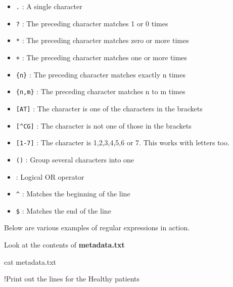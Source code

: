 \documentclass[
  letterpaper,
  DIV=11,
  numbers=noendperiod]{scrreprt}
\newenvironment{Shaded}{\begin{snugshade}}{\end{snugshade}}
\newcommand{\FunctionTok}[1]{\textcolor[rgb]{0.28,0.35,0.67}{#1}}
\newcommand{\NormalTok}[1]{\textcolor[rgb]{0.00,0.23,0.31}{#1}}
\providecommand{\tightlist}{%
  \setlength{\itemsep}{0pt}\setlength{\parskip}{0pt}}\usepackage{longtable,booktabs,array}
\begin{document}
\begin{itemize}
\tightlist
\item
  \texttt{.} : A single character\\
\item
  \texttt{?} : The preceding character matches 1 or 0 times\\
\item
  \texttt{*} : The preceding character matches zero or more times\\
\item
  \texttt{+} : The preceding character matches one or more times\\
\item
  \texttt{\{n\}} : The preceding character matches exactly n times\\
\item
  \texttt{\{n,m\}} : The preceding character matches n to m times\\
\item
  \texttt{{[}AT{]}} : The character is one of the characters in the
  brackets\\
\item
  \texttt{{[}\^{}CG{]}} : The character is not one of those in the
  brackets\\
\item
  \texttt{{[}1-7{]}} : The character is 1,2,3,4,5,6 or 7. This works
  with letters too.\\
\item
  \texttt{()} : Group several characters into one\\
\item
  \texttt{\textbar{}} : Logical OR operator\\
\item
  \texttt{\^{}} : Matches the beginning of the line\\
\item
  \texttt{\$} : Matches the end of the line
\end{itemize}

Below are various examples of regular expressions in action.

Look at the contents of \textbf{metadata.txt}

\begin{Shaded}
\begin{Highlighting}[]
\FunctionTok{cat}\NormalTok{ metadata.txt}
\end{Highlighting}
\end{Shaded}

!Print out the lines for the Healthy patients
\end{document}
